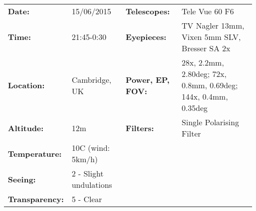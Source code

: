 \begin{tabular}{ p{0.9in} p{1.3in} p{1.2in} p{5.2in}}
{\bf Date:} & 15/06/2015 & {\bf Telescopes:} & Tele Vue 60 F6 \\ 
{\bf Time:} & 21:45-0:30 & {\bf Eyepieces:} & TV Nagler 13mm, Vixen 5mm SLV, Bresser SA 2x \\ 
{\bf Location:} & Cambridge, UK & {\bf Power, EP, FOV:} & 28x, 2.2mm, 2.80deg; 72x, 0.8mm, 0.69deg; 144x, 0.4mm, 0.35deg \\ 
{\bf Altitude:} & 12m & {\bf Filters:} & Single Polarising Filter \\ 
{\bf Temperature:} & 10C (wind: 5km/h) & & \\ 
{\bf Seeing:} & 2 - Slight undulations & & \\ 
{\bf Transparency:} & 5 - Clear & & \\ 
\end{tabular}
